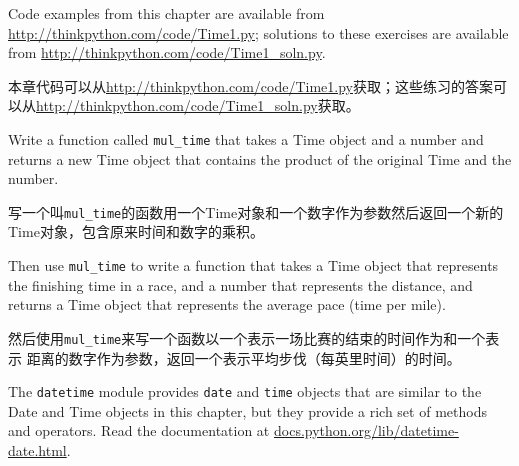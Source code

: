 \documentclass[10pt]{book}
\begin{document}
\begin{CJK}{UTF8}{gbsn}
Code examples from this chapter are available from
\url{http://thinkpython.com/code/Time1.py}; solutions to these
exercises are available from \url{http://thinkpython.com/code/Time1_soln.py}.

本章代码可以从\url{http://thinkpython.com/code/Time1.py}获取；这些练习的答案可
以从\url{http://thinkpython.com/code/Time1_soln.py}获取。

\begin{exercise}

Write a function called \verb"mul_time" that takes a Time object
and a number and returns a new Time object that contains
the product of the original Time and the number.

写一个叫\verb"mul_time"的函数用一个Time对象和一个数字作为参数然后返回一个新的
Time对象，包含原来时间和数字的乘积。

Then use \verb"mul_time" to write a function that takes a Time
object that represents the finishing time in a race, and a number
that represents the distance, and returns a Time object that represents
the average pace (time per mile).

然后使用\verb"mul_time"来写一个函数以一个表示一场比赛的结束的时间作为和一个表示
距离的数字作为参数，返回一个表示平均步伐（每英里时间）的时间。

\end{exercise}





\begin{exercise}

The {\tt datetime} module provides {\tt date} and {\tt time} objects
that are similar to the Date and Time objects in this chapter, but
they provide a rich set of methods and operators.  Read the
documentation at \url{docs.python.org/lib/datetime-date.html}.


\end{exercise}
\end{CJK}
\end{document}
